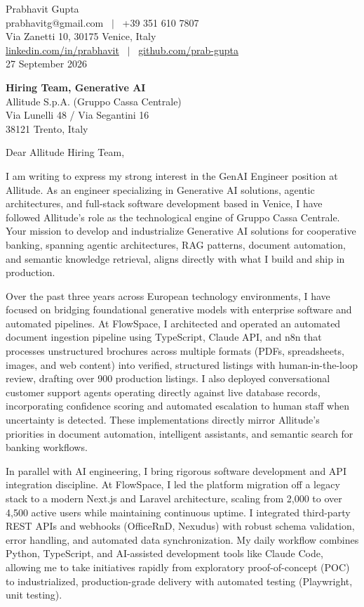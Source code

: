 \documentclass[10.5pt,a4paper]{article}
\begin{document}
Prabhavit Gupta\\
prabhavitg@gmail.com ~$\vert$~ +39 351 610 7807\\
Via Zanetti 10, 30175 Venice, Italy\\
\href{https://www.linkedin.com/in/prabhavit/}{linkedin.com/in/prabhavit} ~$\vert$~ \href{https://github.com/prab-gupta}{github.com/prab-gupta}\\
27 September 2026

\textbf{Hiring Team, Generative AI}\\
Allitude S.p.A. (Gruppo Cassa Centrale)\\
Via Lunelli 48 / Via Segantini 16\\
38121 Trento, Italy

Dear Allitude Hiring Team,

I am writing to express my strong interest in the GenAI Engineer position at Allitude. As an engineer specializing in Generative AI solutions, agentic architectures, and full-stack software development based in Venice, I have followed Allitude's role as the technological engine of Gruppo Cassa Centrale. Your mission to develop and industrialize Generative AI solutions for cooperative banking, spanning agentic architectures, RAG patterns, document automation, and semantic knowledge retrieval, aligns directly with what I build and ship in production.

Over the past three years across European technology environments, I have focused on bridging foundational generative models with enterprise software and automated pipelines. At FlowSpace, I architected and operated an automated document ingestion pipeline using TypeScript, Claude API, and n8n that processes unstructured brochures across multiple formats (PDFs, spreadsheets, images, and web content) into verified, structured listings with human-in-the-loop review, drafting over 900 production listings. I also deployed conversational customer support agents operating directly against live database records, incorporating confidence scoring and automated escalation to human staff when uncertainty is detected. These implementations directly mirror Allitude's priorities in document automation, intelligent assistants, and semantic search for banking workflows.

In parallel with AI engineering, I bring rigorous software development and API integration discipline. At FlowSpace, I led the platform migration off a legacy stack to a modern Next.js and Laravel architecture, scaling from 2,000 to over 4,500 active users while maintaining continuous uptime. I integrated third-party REST APIs and webhooks (OfficeRnD, Nexudus) with robust schema validation, error handling, and automated data synchronization. My daily workflow combines Python, TypeScript, and AI-assisted development tools like Claude Code, allowing me to take initiatives rapidly from exploratory proof-of-concept (POC) to industrialized, production-grade delivery with automated testing (Playwright, unit testing).
\end{document}
